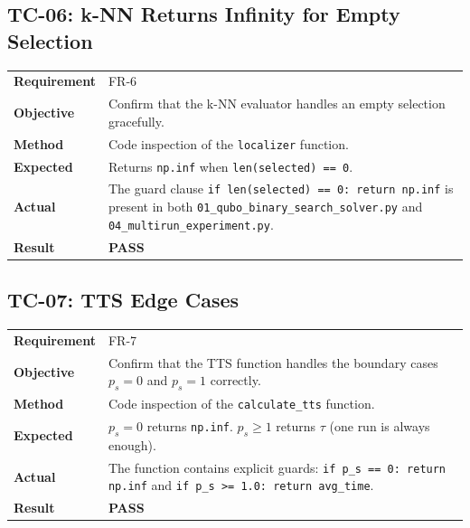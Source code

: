 \documentclass[12pt,a4paper]{article}
\newcommand{\pass}{\textcolor{green!50!black}{\textbf{PASS}}}
\begin{document}
\subsection{TC-06: k-NN Returns Infinity for Empty Selection}

\begin{table}[h!]
\renewcommand{\arraystretch}{1.3}
\begin{tabular}{@{}lp{10cm}@{}}
\toprule
\textbf{Requirement} & FR-6 \\
\textbf{Objective} & Confirm that the k-NN evaluator handles an empty
    selection gracefully. \\
\textbf{Method} & Code inspection of the \texttt{localizer} function. \\
\textbf{Expected} & Returns \texttt{np.inf} when \texttt{len(selected) == 0}. \\
\textbf{Actual} & The guard clause \texttt{if len(selected) == 0: return
    np.inf} is present in both \texttt{01\_qubo\_binary\_search\_solver.py}
    and \texttt{04\_multirun\_experiment.py}. \\
\textbf{Result} & \pass \\
\bottomrule
\end{tabular}
\end{table}

\subsection{TC-07: TTS Edge Cases}

\begin{table}[h!]
\renewcommand{\arraystretch}{1.3}
\begin{tabular}{@{}lp{10cm}@{}}
\toprule
\textbf{Requirement} & FR-7 \\
\textbf{Objective} & Confirm that the TTS function handles the boundary
    cases $p_s = 0$ and $p_s = 1$ correctly. \\
\textbf{Method} & Code inspection of the \texttt{calculate\_tts} function. \\
\textbf{Expected} & $p_s = 0$ returns \texttt{np.inf}. $p_s \geq 1$
    returns $\tau$ (one run is always enough). \\
\textbf{Actual} & The function contains explicit guards:
    \texttt{if p\_s == 0: return np.inf} and
    \texttt{if p\_s >= 1.0: return avg\_time}. \\
\textbf{Result} & \pass \\
\bottomrule
\end{tabular}
\end{table}
\end{document}
